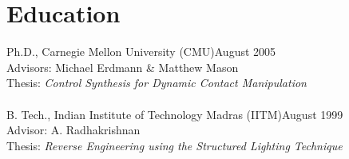 
\section{Education}
\noindent
Ph.D., Carnegie Mellon University (CMU)\hfill August 2005\\
Advisors: Michael Erdmann \& Matthew Mason\\
Thesis:  \textit{Control Synthesis for Dynamic Contact Manipulation}\\
\\
B. Tech., Indian Institute of Technology Madras (IITM)\hfill August 1999\\
Advisor: A. Radhakrishnan\\
Thesis: \textit{Reverse Engineering using the Structured Lighting Technique}
